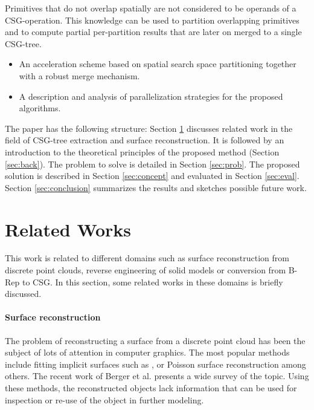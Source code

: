 Primitives that do not overlap spatially are not considered to be operands of a \ac{CSG}-operation.
This knowledge can be used to partition overlapping primitives and to compute partial per-partition results that are later on merged to a single \ac{CSG}-tree. 
\\
\begin{itemize}
\item An acceleration scheme based on spatial search space partitioning together with a robust merge mechanism.
\item A description and analysis of parallelization strategies for the proposed algorithms.
\end{itemize}  
The paper has the following structure: 
Section \ref{sec:relworks} discusses related work in the field of \ac{CSG}-tree extraction and surface reconstruction.
It is followed by an introduction to the theoretical principles of the proposed method (Section \ref{sec:back}).
The problem to solve is detailed in Section \ref{sec:prob}.
The proposed solution is described in Section \ref{sec:concept} and evaluated in Section \ref{sec:eval}.
Section \ref{sec:conclusion} summarizes the results and sketches possible future work.
 
\copyrightspace

\section{Related Works}
\label{sec:relworks}
This work is related to different domains such as surface reconstruction from discrete point clouds, reverse engineering of solid models or conversion from B-Rep to CSG. 
In this section, some related works in these domains is briefly discussed. 

\paragraph{Surface reconstruction}
The problem of reconstructing a surface from a discrete point cloud has been the subject of lots of attention in computer graphics. 
The most popular methods include fitting implicit surfaces such as \cite{OBATS03}, or Poisson surface reconstruction \cite{KH13} among others. 
The recent work of Berger et al. \cite{berger2017survey} presents a wide survey of the topic.
Using these methods, the reconstructed objects lack information that can be used for inspection or re-use of the object in further modeling. 

